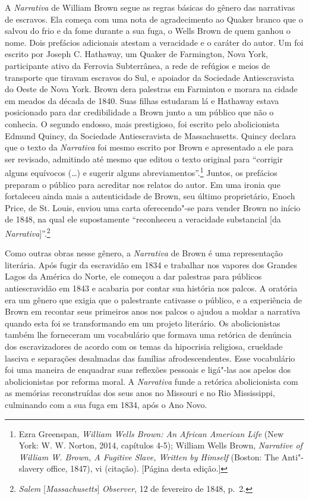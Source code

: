 A \emph{Narrativa} de William Brown segue as regras básicas do gênero
das narrativas de escravos. Ela começa com uma nota de agradecimento ao
Quaker branco que o salvou do frio e da fome durante a sua fuga, o Wells %
Brown de quem ganhou o nome. Dois prefácios adicionais atestam a
veracidade e o caráter do autor. Um foi escrito por Joseph C. Hathaway,
um Quaker de Farmington, Nova York, participante ativo da Ferrovia
Subterrânea, a rede de refúgios e meios de transporte que tiravam
escravos do Sul, e apoiador da Sociedade Antiescravista do Oeste de Nova
York. Brown dera palestras em Farminton e morara na cidade em meados da
década de 1840. Suas filhas estudaram lá e Hathaway estava posicionado
para dar credibilidade a Brown junto a um público que não o conhecia. O
segundo endosso, mais prestigioso, foi escrito pelo abolicionista Edmund
Quincy, da Sociedade Antiescravista de Massachusetts. Quincy declara que
o texto da \emph{Narrativa} foi mesmo escrito por Brown e apresentado a
ele para ser revisado, admitindo até mesmo que editou o texto original
para ``corrigir alguns equívocos (\ldots{}) e sugerir alguns
abreviamentos''.\footnote{Ezra Greenspan, \emph{William Wells Brown: An
  African American Life} (New York: W. W. Norton, 2014, capítulos 4-5);
  William Wells Brown, \emph{Narrative of William W. Brown, A Fugitive
  Slave, Written by Himself} (Boston: The Anti"-slavery office, 1847), vi
  (citação). {[}Página \pageref{ref1} desta edição.{]}} Juntos, os prefácios
preparam o público para acreditar nos relatos do autor. Em uma ironia
que fortaleceu ainda mais a autenticidade de Brown, seu último
proprietário, Enoch Price, de St. Louis, enviou uma carta oferecendo"-se
para vender Brown no início de 1848, na qual ele supostamente
``reconheceu a veracidade substancial {[}da
\emph{Narrativa}{]}''.\footnote{\emph{Salem} {[}\emph{Massachusetts}{]}
  \emph{Observer}, 12 de fevereiro de 1848, p.~2.}

Como outras obras nesse gênero, a \emph{Narrativa} de Brown é uma
representação literária. Após fugir da escravidão em 1834 e trabalhar
nos vapores dos Grandes Lagos da América do Norte, ele começou a dar
palestras para públicos antiescravidão em 1843 e acabaria por contar sua
história nos palcos. A oratória era um gênero que exigia que o
palestrante cativasse o público, e a experiência de Brown em recontar
seus primeiros anos nos palcos o ajudou a moldar a narrativa quando esta
foi se transformando em um projeto literário. Os abolicionistas também
lhe forneceram um vocabulário que formava uma retórica de denúncia dos
escravizadores de acordo com os temas da hipocrisia religiosa, crueldade
lasciva e separações desalmadas das famílias afrodescendentes. Esse
vocabulário foi uma maneira de enquadrar suas reflexões pessoais e
ligá"-las aos apelos dos abolicionistas por reforma moral. A
\emph{Narrativa} funde a retórica abolicionista com as memórias
reconstruídas dos seus anos no Missouri e no Rio Mississippi, culminando
com a sua fuga em 1834, após o Ano Novo.

